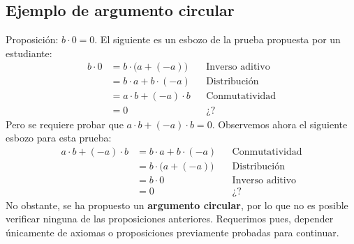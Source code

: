 \documentclass[11pt]{article}
\begin{document}
\subsection*{Ejemplo de argumento circular}
%
%
Proposición: $b\cdot 0 = 0$. El siguiente es un esbozo de la prueba propuesta por un estudiante:
%
%
\vspace{1em} \begin{align*}
    b\cdot 0 &= b\cdot \bigl(a+ (-a)\bigr) && \text{Inverso aditivo}\\
    &= b\cdot a + b\cdot (-a) && \text{Distribución}\\
    &= a\cdot b + (-a) \cdot b && \text{Conmutatividad}\\
    &= 0 && \text{¿?}
\end{align*}
Pero se requiere probar que $a\cdot b+(-a)\cdot b=0$. Observemos ahora el siguiente esbozo para esta prueba: \vspace{1em} \begin{align*}
    a\cdot b+ (-a) \cdot b &= b\cdot a + b\cdot (-a) && \text{Conmutatividad}\\
    &= b\cdot \bigl(a+(-a)\bigr) && \text{Distribución}\\
    &= b\cdot 0 && \text{Inverso aditivo}\\
    &= 0 && \text{¿?}
\end{align*}
No obstante, se ha propuesto un \textbf{argumento circular}, por lo que no es posible verificar ninguna de las proposiciones anteriores. Requerimos pues, depender únicamente de axiomas o proposiciones previamente probadas para continuar.
\end{document}

